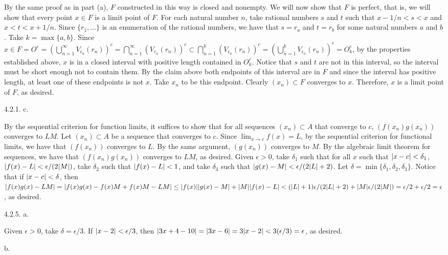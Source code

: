 By the same proof as in part (a),
$F$ constructed in this way is closed and nonempty.
We will now show that $F$ is perfect, that is,
we will show that every point $x \in F$
is a limit point of $F$.
For each natural number $n$,
take rational numbers $s$ and $t$ such that
$x - 1/n < s < x$ and $x < t < x + 1/n$.
Since $\{r_1, \ldots\}$ is an enumeration of the rational numbers,
we have that $s = r_a$ and $t = r_b$ for some natural numbers $a$ and $b$.
Take $k = \max \{a, b\}$.
Since $x \in F = O^c = (\bigcup _{n=1} ^\infty V _{\epsilon _n} (r_n))^c =
\bigcap _{n=1} ^\infty (V _{\epsilon _n} (r_n))^c \subset
\bigcap _{n=1} ^k (V _{\epsilon _n} (r_n))^c =
(\bigcup _{n=1} ^k V _{\epsilon _n} (r_n))^c = O_k^c$,
by the properties established above,
$x$ is in a closed interval with positive length contained in $O_k^c$.
Notice that $s$ and $t$ are not in this interval,
so the interval must be short enough not to contain them.
By the claim above both endpoints of this interval are in $F$
and since the interval has positive length, at least one of these endpoints
is not $x$.
Take $x_n$ to be this endpoint.
Clearly $(x_n) \subset F$ converges to $x$.
Therefore, $x$ is a limit point of $F$, as desired.
\bigskip
\item{4.2.1.} c.

By the sequential criterion for function limits, it suffices to show that
for all sequences $(x_n) \subset A$ that converge to $c$,
$(f(x_n) g(x_n))$ converges to $LM$.
Let $(x_n) \subset A$ be a sequence that converges to $c$.
Since $\lim _{x \to c} f(x) = L$,
by the sequential criterion for functional limits,
we have that $(f(x_n))$ converges to $L$.
By the same argument, $(g(x_n))$ converges to $M$.
By the algebraic limit theorem for sequences, we have that
$(f(x_n) g(x_n))$ converges to $LM$, as desired.
\medskip
Given $\epsilon > 0$, take $\delta _1$ such that
for all $x$ such that $\vert x - c\vert < \delta _1$,
$\vert f(x) - L\vert < \epsilon / (2 \vert M\vert)$,
take $\delta _2$ such that
$\vert f(x) - L\vert < 1$, and
take $\delta _3$ such that
$\vert g(x) - M\vert < \epsilon / (2 \vert L\vert + 2)$.
Let $\delta = \min \{\delta _1, \delta _2, \delta _3\}$.
Notice that if $\vert x - c\vert < \delta$, then
$\vert f(x) g(x) - LM\vert = \vert f(x) g(x) - f(x) M + f(x) M - LM\vert \le
\vert f(x)\vert \vert g(x) - M\vert + \vert M\vert \vert f(x) - L\vert <
(\vert L\vert + 1) \epsilon / (2 \vert L\vert + 2) + \vert M\vert \epsilon / (2 \vert M\vert) =
\epsilon / 2 + \epsilon / 2 = \epsilon$, as desired.
\bigskip
\item{4.2.5.} a.

Given $\epsilon > 0$, take $\delta = \epsilon / 3$.
If $\vert x - 2\vert < \epsilon / 3$, then
$\vert3x + 4 - 10\vert = \vert3x - 6\vert = 3 \vert x - 2\vert <
3 (\epsilon / 3) = \epsilon$, as desired.
\medskip
\item{} b.

